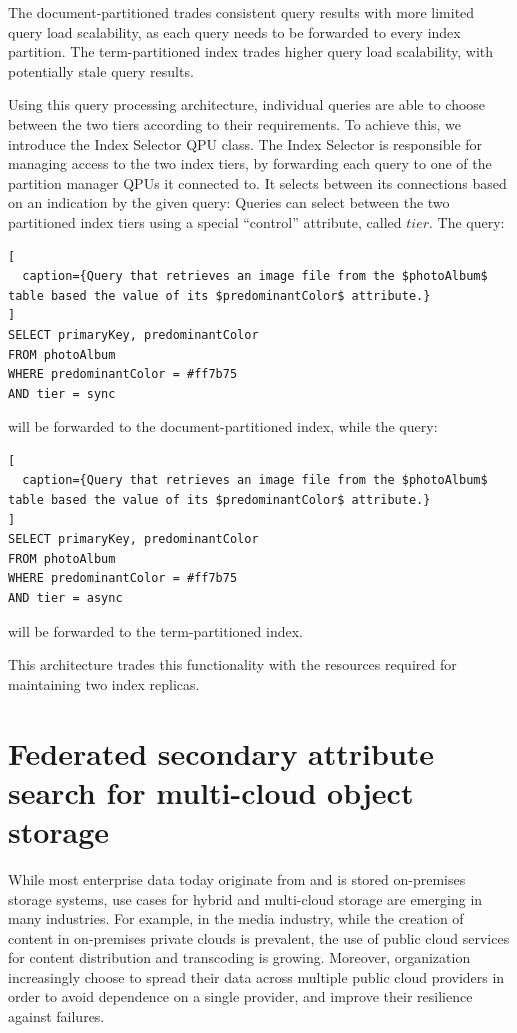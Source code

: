 The document-partitioned trades consistent query results with more limited query load scalability,
as each query needs to be forwarded to every index partition.
The term-partitioned index trades higher query load scalability, with potentially stale query results.

Using this query processing architecture, individual queries are able to choose between the two tiers
according to their requirements.
To achieve this, we introduce the Index Selector QPU class.
The Index Selector is responsible for managing access to the two index tiers,
by forwarding each query to one of the partition manager QPUs it connected to.
It selects between its connections based on an indication by the given query:
Queries can select between the two partitioned index tiers using a special ``control'' attribute, called $tier$.
The query:

\begin{lstlisting}[
  caption={Query that retrieves an image file from the $photoAlbum$ table based the value of its $predominantColor$ attribute.}
]
SELECT primaryKey, predominantColor
FROM photoAlbum
WHERE predominantColor = #ff7b75
AND tier = sync
\end{lstlisting}

\noindent
will be forwarded to the document-partitioned index, while the query:

\begin{lstlisting}[
  caption={Query that retrieves an image file from the $photoAlbum$ table based the value of its $predominantColor$ attribute.}
]
SELECT primaryKey, predominantColor
FROM photoAlbum
WHERE predominantColor = #ff7b75
AND tier = async
\end{lstlisting}

\noindent
will be forwarded to the term-partitioned index.

This architecture trades this functionality with the resources required for maintaining
two index replicas.



\section{Federated secondary attribute search for multi-cloud object storage}
\label{sec:zenko}

While most enterprise data today originate from and is stored on-premises storage systems,
use cases for hybrid and multi-cloud storage are emerging in many industries.
For example, in the media industry, while the creation of content in on-premises private clouds is prevalent,
the use of public cloud services for content distribution and transcoding \cite{scality:bloomberg} is growing.
Moreover, organization increasingly choose to spread their data across multiple public cloud providers in order to avoid
dependence on a single provider, and improve their resilience against failures.

